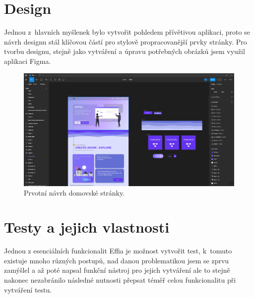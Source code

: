 \documentclass[12pt, a4paper,
openright
]{report}
\begin{document}
\section{Design}
Jednou z~hlavních myšlenek bylo vytvořit pohledem přívětivou aplikaci, proto se návrh designu stál klíčovou částí pro stylově propracovanější prvky stránky. Pro tvorbu designu, stejně jako vytváření a úpravu potřebných obrázků jsem využil aplikaci Figma.
\begin{figure}[h]
	\centering %
	\includegraphics[width=1\linewidth]{image/figma.png} 
	\caption{Prvotní návrh domovské stránky.} %
	\label{fig:figma} %
\end{figure}

\section{Testy a jejich vlastnosti}
Jednou z esenciálních funkcionalit Effia je možnost vytvořit test, k~tomuto existuje mnoho různých postupů, nad danou problematikou jsem se zprvu zamýšlel a až poté napsal funkční nástroj pro jejich vytváření ale to stejně nakonec nezabránilo následné nutnosti přepsat téměř celou funkcionalitu při vytváření testu.
\end{document}
